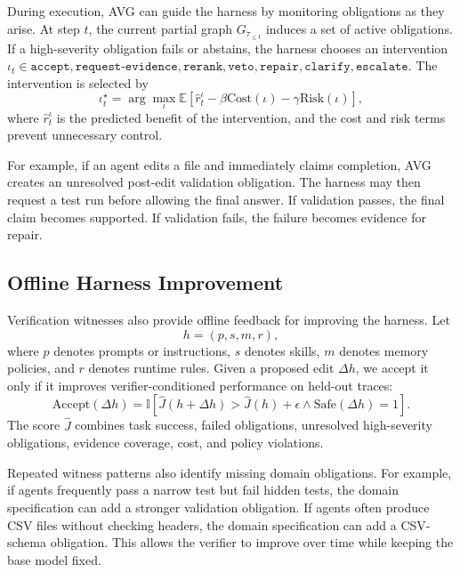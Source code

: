 \documentclass{article} %
\newcommand{\AVG}{\textsc{AVG}\xspace}
\begin{document}
During execution, \AVG can guide the harness by monitoring obligations as they arise. At step $t$, the current partial graph $G_{\tau_{\leq t}}$ induces a set of active obligations. If a high-severity obligation fails or abstains, the harness chooses an intervention
$
\iota_t \in
{
\texttt{accept},
\texttt{request-evidence},
\texttt{rerank},
\texttt{veto},
\texttt{repair},
\texttt{clarify},
\texttt{escalate}
}.
$
The intervention is selected by
\begin{equation}
\iota_t^\star
=
\arg\max_{\iota}
\mathbb{E}
\left[
\hat r_t^\iota
-\beta \mathrm{Cost}(\iota) - 
\gamma \mathrm{Risk}(\iota)
\right],
\end{equation}
where $\hat r_t^\iota$ is the predicted benefit of the intervention, and the cost and risk terms prevent unnecessary control.

For example, if an agent edits a file and immediately claims completion, \AVG creates an unresolved post-edit validation obligation. The harness may then request a test run before allowing the final answer. If validation passes, the final claim becomes supported. If validation fails, the failure becomes evidence for repair.

\subsection{Offline Harness Improvement}

Verification witnesses also provide offline feedback for improving the harness. Let
\begin{equation}
h=(p,s,m,r),
\end{equation}
where $p$ denotes prompts or instructions, $s$ denotes skills, $m$ denotes memory policies, and $r$ denotes runtime rules. Given a proposed edit $\Delta h$, we accept it only if it improves verifier-conditioned performance on held-out traces:
\begin{equation}
\mathrm{Accept}(\Delta h)
=
\mathbb{I}
\left[
\hat J(h+\Delta h) > \hat J(h)+\epsilon
\wedge
\mathrm{Safe}(\Delta h)=1
\right].
\end{equation}
The score $\hat J$ combines task success, failed obligations, unresolved high-severity obligations, evidence coverage, cost, and policy violations.

Repeated witness patterns also identify missing domain obligations. For example, if agents frequently pass a narrow test but fail hidden tests, the domain specification can add a stronger validation obligation. If agents often produce CSV files without checking headers, the domain specification can add a CSV-schema obligation. This allows the verifier to improve over time while keeping the base model fixed.
\end{document}
